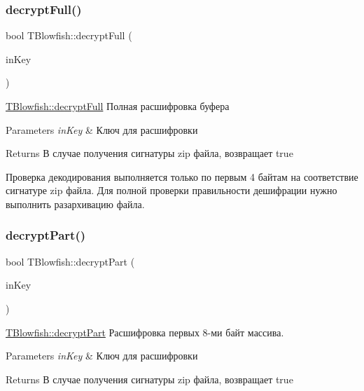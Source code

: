 \subsubsection{\texorpdfstring{decrypt\+Full()}{decryptFull()}}
{\footnotesize\ttfamily bool T\+Blowfish\+::decrypt\+Full (\begin{DoxyParamCaption}\item[{Q\+String}]{in\+Key }\end{DoxyParamCaption})}



\hyperlink{classblowfish_lib_1_1_t_blowfish_aa6cf535926e4a3daae058725a6192619}{T\+Blowfish\+::decrypt\+Full} Полная расшифровка буфера 


\begin{DoxyParams}{Parameters}
{\em in\+Key} & Ключ для расшифровки \\
\hline
\end{DoxyParams}
\begin{DoxyReturn}{Returns}
В случае получения сигнатуры zip файла, возвращает true
\end{DoxyReturn}
Проверка декодирования выполняется только по первым 4 байтам на соответствие сигнатуре zip файла. Для полной проверки правильности дешифрации нужно выполнить разархивацию файла. \mbox{\label{classblowfish_lib_1_1_t_blowfish_a5bb77f2618aa5dd97b86d842e546fdae}} 
\subsubsection{\texorpdfstring{decrypt\+Part()}{decryptPart()}}
{\footnotesize\ttfamily bool T\+Blowfish\+::decrypt\+Part (\begin{DoxyParamCaption}\item[{Q\+String}]{in\+Key }\end{DoxyParamCaption})}



\hyperlink{classblowfish_lib_1_1_t_blowfish_a5bb77f2618aa5dd97b86d842e546fdae}{T\+Blowfish\+::decrypt\+Part} Расшифровка первых 8-\/ми байт массива. 


\begin{DoxyParams}{Parameters}
{\em in\+Key} & Ключ для расшифровки \\
\hline
\end{DoxyParams}
\begin{DoxyReturn}{Returns}
В случае получения сигнатуры zip файла, возвращает true 
\end{DoxyReturn}
\mbox{\label{classblowfish_lib_1_1_t_blowfish_ab1f9fc3cc9b075c3b9b558b5719c159e}} 
